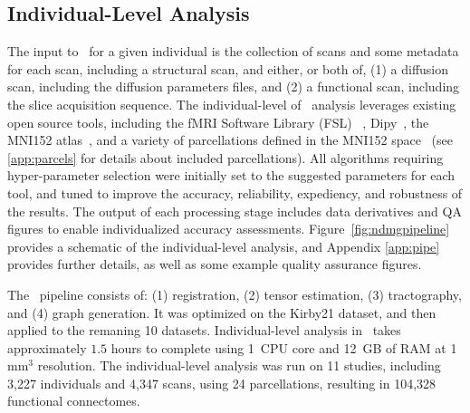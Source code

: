 \documentclass[11pt]{article}
\begin{document}
\begin{multicols}{2}
%

\subsection{Individual-Level Analysis}

The input to \ndmg~for a given individual is  the collection of scans and some metadata for each scan, including a structural scan, %
and either, or both of, (1) a diffusion scan, including the diffusion parameters files,  and (2) a functional scan, including the slice acquisition sequence.
The individual-level of \ndmg~analysis leverages existing open source tools, including
the fMRI Software Library (FSL) ~\cite{fsl1, fsl2, fsl3}, Dipy~\cite{dipy}, the MNI152 atlas~\cite{mni152}, and a variety of parcellations defined in the MNI152 space~\cite{desikan, aal, jhu, harvardoxford, talairach, slab907, slab1068, pvt, glasser} (see \ref{app:parcels} for details about included parcellations). 
All algorithms requiring hyper-parameter selection were initially set to the suggested parameters for each tool, and tuned to improve the accuracy, reliability, expediency, and robustness of the results.
The output of each processing stage includes data derivatives and QA figures to enable individualized accuracy assessments.
Figure~\ref{fig:ndmgpipeline} provides a schematic of the individual-level analysis, and Appendix  
\ref{app:pipe} provides further details, as well as some example quality assurance figures.

The \ndmgd~pipeline consists of: (1) registration, (2) tensor estimation, (3) tractography, and (4) graph generation. It was optimized on the Kirby21 dataset, and then applied to the remaning 10 datasets.
Individual-level analysis in \ndmgd~takes approximately $1.5$ hours to complete using 1~CPU core and 12~GB of RAM at 1 mm$^3$ resolution.
The individual-level analysis was run on 11 studies, including 3,227 individuals and 4,347 scans, using 24 parcellations,  resulting in 104,328 functional connectomes.


\end{multicols}
\end{document}
